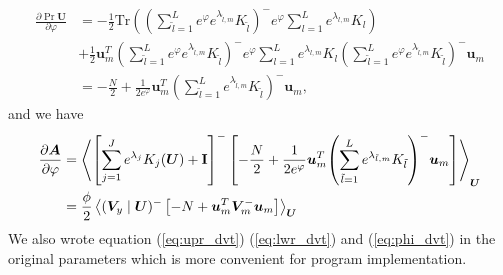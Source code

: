 \documentclass[11pt]{article}
\newcommand{\mean}[2]{\left\langle{#1}\right\rangle_{#2}}
\newcommand{\trb}[1]{\textrm{Tr}\left({#1}\right)}
\newcommand{\invb}[1]{{\left({#1}\right)^-}}
\newcommand{\invs}[1]{{\left[{#1}\right]^-}}
\newcommand{\vu}{\boldsymbol{u}}
\newcommand{\xv}{\boldsymbol{V}}
\newcommand{\xu}{\boldsymbol{U}}
\newcommand{\xa}{\boldsymbol{A}}
\newcommand{\id}{\textrm{\textbf{I}}}
\newcommand{\PDV}[2]{\frac{\partial #1}{\partial #2}}
\begin{document}
\begin{align*}
  \PDV{\Pr{\xu}}{\varphi} &= -\frac{1}{2}\trb{
                            \invb{\sum_{\tilde{l}=1}^L e^{\varphi} e^{\lambda_{\tilde{l},m}}K_{\tilde{l}}} 
                            e^{\varphi}\sum_{l=1}^L e^{\lambda_{l,m}}K_l
                            } \\
                          &+ \frac{1}{2}
                            \vu_m^T
                            \invb{\sum_{\tilde{l}=1}^L e^{\varphi} e^{\lambda_{\tilde{l},m}}K_{\tilde{l}}}
                            e^{\varphi}\sum_{l=1}^L e^{\lambda_{l,m}}K_l
                            \invb{\sum_{\tilde{l}=1}^L e^{\varphi} e^{\lambda_{\tilde{l},m}}K_{\tilde{l}}}
                            \vu_m \\
                          &= -\frac{N}{2} + \frac{1}{2 e^{\varphi}}
                            \vu_m^T
                            \invb{\sum_{\tilde{l}=1}^L e^{\lambda_{\tilde{l},m}}K_{\tilde{l}}}
                            \vu_m,
\end{align*}
and we have
\begin{equation}\label{eq:phi_dvt}
  \begin{split}
    \PDV{\xa}{\varphi}
    &= \mean{ 
      \invs{\sum_{j=1}^J{e^{\lambda_j} K_j(\xu)} + \id}
      \left[
        -\frac{N}{2} + \frac{1}{2 e^{\varphi}}
        \vu_m^T
        \invb{\sum_{\tilde{l}=1}^L e^{\lambda_{\tilde{l},m}}K_{\tilde{l}}}
        \vu_m
      \right]
    }{\xu} \\
    &= \frac{\phi}{2}\mean{
      (\xv_y \mid \xu)^-
      \left[
        -N + \vu_m^T \xv_m^- \vu_m
      \right]
    }{\xu}
  \end{split}
\end{equation}
We also wrote equation (\ref{eq:upr_dvt}) (\ref{eq:lwr_dvt}) and (\ref{eq:phi_dvt}) in the original parameters which is more convenient for program implementation.
\end{document}
